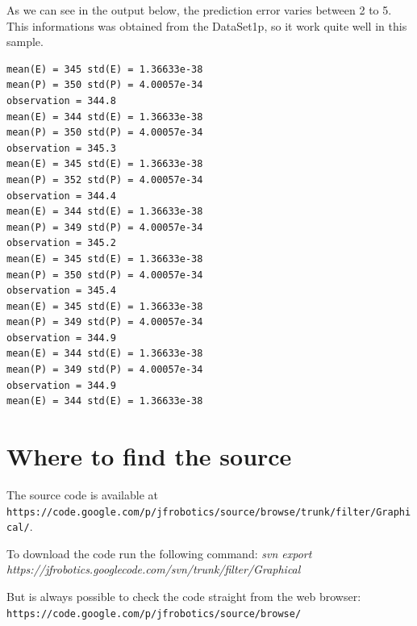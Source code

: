 \documentclass{article}
\begin{document}
As we can see in the output below, the prediction error varies between 2 to 5. This informations was obtained from the DataSet1p, so it work quite well in this sample.

\begin{lstlisting}
mean(E) = 345 std(E) = 1.36633e-38
mean(P) = 350 std(P) = 4.00057e-34
observation = 344.8
mean(E) = 344 std(E) = 1.36633e-38
mean(P) = 350 std(P) = 4.00057e-34
observation = 345.3
mean(E) = 345 std(E) = 1.36633e-38
mean(P) = 352 std(P) = 4.00057e-34
observation = 344.4
mean(E) = 344 std(E) = 1.36633e-38
mean(P) = 349 std(P) = 4.00057e-34
observation = 345.2
mean(E) = 345 std(E) = 1.36633e-38
mean(P) = 350 std(P) = 4.00057e-34
observation = 345.4
mean(E) = 345 std(E) = 1.36633e-38
mean(P) = 349 std(P) = 4.00057e-34
observation = 344.9
mean(E) = 344 std(E) = 1.36633e-38
mean(P) = 349 std(P) = 4.00057e-34
observation = 344.9
mean(E) = 344 std(E) = 1.36633e-38
\end{lstlisting}

\section{Where to find the source}

The source code is available at \texttt{https://code.google.com/p/jfrobotics/source/browse/trunk/filter/Graphical/}.

To download the code run the following command:
\textit{svn export https://jfrobotics.googlecode.com/svn/trunk/filter/Graphical}

But is always possible to check the code straight from the web browser:
\texttt{https://code.google.com/p/jfrobotics/source/browse/}
\end{document}
